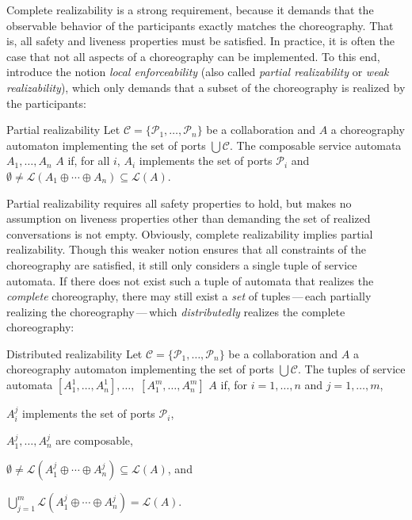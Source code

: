 Complete realizability is a strong requirement, because it demands that the observable behavior of the participants exactly matches the choreography. That is, all safety and liveness properties must be satisfied. In practice, it is often the case that not all aspects of a choreography can be implemented. To this end, \citet{ZahaDHBD_2006_edoc} introduce the  notion \emph{local enforceability} (also called \emph{partial realizability} or \emph{weak realizability}), which only demands that a subset of the choreography is realized by the participants:

\begin{definition}{Partial realizability}%
Let $\mathcal{C}=\{\mathcal{P}_{1},\ldots,\mathcal{P}_{n}\}$ be a collaboration and $A$ a choreography automaton implementing the set of ports $\bigcup \mathcal{C}$. The composable service automata $A_{1},\ldots,A_{n}$  $A$ if, for all $i$, $A_{i}$ implements the set of ports $\mathcal{P}_{i}$ and $\emptyset\neq\mathcal{L}(A_{1}\oplus\cdots\oplus A_{n})\subseteq\mathcal{L}(A)$.
\end{definition}

Partial realizability requires all safety properties to hold, but makes no assumption on liveness properties other than demanding the set of realized conversations is not empty. Obviously, complete realizability implies partial realizability. Though this weaker notion ensures that all constraints of the choreography are satisfied, it still only considers a single tuple of service automata. If there does not exist such a tuple of automata that realizes the \emph{complete} choreography, there may still exist a \emph{set} of tuples\,---\,each partially realizing the choreography\,---\,which \emph{distributedly} realizes the complete choreography:

\begin{definition}{Distributed realizability}%
Let $\mathcal{C}=\{\mathcal{P}_{1},\ldots,\mathcal{P}_{n}\}$ be a collaboration and $A$ a choreography automaton implementing the set of ports $\bigcup \mathcal{C}$. The tuples of service automata $[A_{1}^{1},\ldots,A_{n}^{1}],\ldots,$ $[A_{1}^{m},\ldots,A_{n}^{m}]$  $A$ if, for $i=1,\ldots,n$ and $j=1,\ldots,m$,
\begin{myenumerate}
\item $A_{i}^{j}$ implements the set of ports $\mathcal{P}_{i}$,
\item $A_{1}^{j},\ldots, A_{n}^{j}$ are composable,
\item $\emptyset\neq\mathcal{L}(A_{1}^{j}\oplus\cdots\oplus A_{n}^{j})\subseteq \mathcal{L}(A)$, and
\item $\bigcup_{j=1}^m \mathcal{L}(A_{1}^{j}\oplus\cdots\oplus A_{n}^{j}) = \mathcal{L}(A)$.
\end{myenumerate}
\end{definition}

